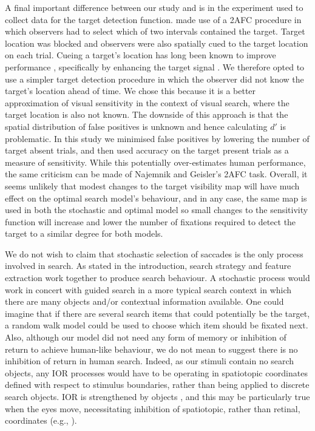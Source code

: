 \documentclass[preprint, authoryear]{elsarticle} %
\begin{document}
A final important difference between our study and \citet{najemnik-geisler2005,najemnik-geisler2008} is in the experiment used to collect data for the target detection function. \citet{najemnik-geisler2005,najemnik-geisler2008} made use of a 2AFC procedure in which observers had to select which of two intervals contained the target. Target location was blocked and observers were also spatially cued to the target location on each trial. Cueing a target's location has long been known to improve performance \cite{posner1980}, specifically by enhancing the target signal \cite{yeshurun1998}. We therefore opted to use a simpler target detection procedure in which the observer did not know the target's location ahead of time. We chose this because it is a better approximation of visual sensitivity in the context of visual search, where the target location is also not known. The downside of this approach is that the spatial distribution of false positives is unknown and hence calculating $d'$ is problematic. In this study we minimised false positives by lowering the number of target absent trials, and then used accuracy on the target present trials as a measure of sensitivity. While this potentially over-estimates human performance, the same criticism can be made of Najemnik and Geisler's 2AFC task. Overall, it seems unlikely that modest changes to the target visibility map will have much effect on the optimal search model's behaviour, and in any case, the same map is used in both the stochastic and optimal model so small changes to the sensitivity function will increase and lower the number of fixations required to detect the target to a similar degree for both models.

\par
We do not wish to claim that stochastic selection of saccades is the only process involved in search. As stated in the introduction, search strategy and feature extraction work together to produce search behaviour. A stochastic process would work in concert with guided search in a more typical search context in which there are many objects and/or contextual information available. One could imagine that if there are several search items that could potentially be the target, a random walk model could be used to choose which item should be fixated next. Also, although our model did not need any form of memory or inhibition of return to achieve human-like behaviour, we do not mean to suggest there is no inhibition of return in human search. Indeed, as our stimuli contain no search objects, any IOR processes would have to be operating in spatiotopic coordinates defined with respect to stimulus boundaries, rather than being applied to discrete search objects. IOR is strengthened by objects \citep{jordan1998}, and this may be particularly true when the eyes move, necessitating inhibition of spatiotopic, rather than retinal, coordinates (e.g., \cite{kruger2013}). 
\end{document}

